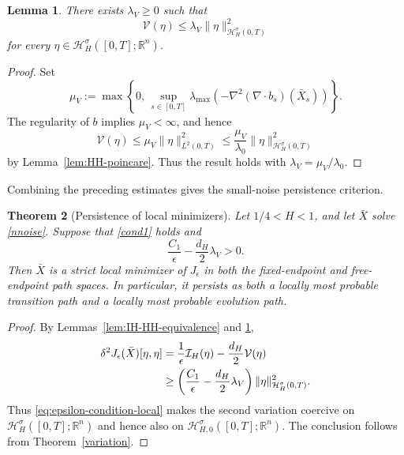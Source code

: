 \documentclass[preprint,12pt]{elsarticle}
\newtheorem{theorem}{Theorem}[section]
\newtheorem{lemma}[theorem]{Lemma}
\theoremstyle{definition}
\theoremstyle{plain}
\begin{document}
\begin{lemma}
\label{lem:potential-upper-bound}
There exists $\lambda_V\geq0$ such that
\begin{equation}
\label{eq:potential-upper-bound}
    \mathcal V(\eta)
    \leq
    \lambda_V
    \|\eta\|_{\mathcal H_H^\sigma(0,T)}^2
\end{equation}
for every
$\eta\in\mathcal H_H^\sigma([0,T];\mathbb R^n)$.
\end{lemma}

\begin{proof}
Set
\begin{equation}
\label{eq:lambda-V-definition}
    \mu_V
    :=
    \max\left\{
        0,\,
        \sup_{s\in[0,T]}
        \lambda_{\max}
        \left(
            -\nabla^2(\nabla\!\cdot b_s)(\bar X_s)
        \right)
    \right\}.
\end{equation}
The regularity of $b$ implies $\mu_V<\infty$, and hence
\begin{equation*}
    \mathcal V(\eta)
    \leq
    \mu_V\|\eta\|_{L^2(0,T)}^2
    \leq
    \frac{\mu_V}{\lambda_0}
    \|\eta\|_{\mathcal H_H^\sigma(0,T)}^2
\end{equation*}
by Lemma~\ref{lem:HH-poincare}. Thus the result holds with
$\lambda_V=\mu_V/\lambda_0$.
\end{proof}

Combining the preceding estimates gives the small-noise persistence
criterion.

\begin{theorem}[Persistence of local minimizers]
\label{thm:local-minimizer-small-noise}
Let $1/4<H<1$, and let $\bar X$ solve \eqref{nnoise}. Suppose that
\eqref{cond1} holds and
\begin{equation}
\label{eq:epsilon-condition-local}
    \frac{C_1}{\epsilon}
    -
    \frac{d_H}{2}\lambda_V
    >
    0.
\end{equation}
Then $\bar X$ is a strict local minimizer of $J_\epsilon$ in both the
fixed-endpoint and free-endpoint path spaces. In particular, it
persists as both a locally most probable transition path and a locally
most probable evolution path.
\end{theorem}

\begin{proof}
By Lemmas~\ref{lem:IH-HH-equivalence} and
\ref{lem:potential-upper-bound},
\begin{align}
    \delta^2J_\epsilon(\bar X)[\eta,\eta]
    &=
    \frac{1}{\epsilon}\mathcal I_H(\eta)
    -
    \frac{d_H}{2}\mathcal V(\eta)
    \notag\\
    &\geq
    \left(
        \frac{C_1}{\epsilon}
        -
        \frac{d_H}{2}\lambda_V
    \right)
    \|\eta\|_{\mathcal H_H^\sigma(0,T)}^2.
    \label{eq:second-variation-coercive}
\end{align}
Thus \eqref{eq:epsilon-condition-local} makes the second variation
coercive on $\mathcal H_H^\sigma([0,T];\mathbb R^n)$ and hence also on
$\mathcal H_{H,0}^\sigma([0,T];\mathbb R^n)$. The conclusion follows
from Theorem~\ref{variation}.
\end{proof}
\end{document}
